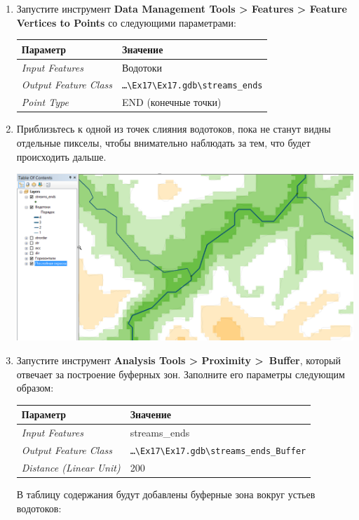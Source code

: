 \documentclass[]{book}
\theoremstyle{definition}
\theoremstyle{definition}
\theoremstyle{definition}
\theoremstyle{remark}
\begin{document}
\begin{enumerate}
\def\labelenumi{\arabic{enumi}.}
\item
  Запустите инструмент \textbf{Data Management Tools \textgreater{}
  Features \textgreater{} Feature Vertices to Points} со следующими
  параметрами:

  \begin{longtable}[]{@{}ll@{}}
  \toprule
  Параметр & Значение\tabularnewline
  \midrule
  \endhead
  \emph{Input Features} & Водотоки\tabularnewline
  \emph{Output Feature Class} &
  \texttt{\ldots{}\textbackslash{}Ex17\textbackslash{}Ex17.gdb\textbackslash{}streams\_ends}\tabularnewline
  \emph{Point Type} & END (конечные точки)\tabularnewline
  \bottomrule
  \end{longtable}
\item
  Приблизьтесь к одной из точек слияния водотоков, пока не станут видны
  отдельные пикселы, чтобы внимательно наблюдать за тем, что будет
  происходить дальше.

  \includegraphics{images/Ex17/image19.png}
\item
  Запустите инструмент \textbf{Analysis Tools \textgreater{} Proximity
  \textgreater{}~Buffer}, который отвечает за построение буферных зон.
  Заполните его параметры следующим образом:

  \begin{longtable}[]{@{}ll@{}}
  \toprule
  Параметр & Значение\tabularnewline
  \midrule
  \endhead
  \emph{Input Features} & streams\_ends\tabularnewline
  \emph{Output Feature Class} &
  \texttt{\ldots{}\textbackslash{}Ex17\textbackslash{}Ex17.gdb\textbackslash{}streams\_ends\_Buffer}\tabularnewline
  \emph{Distance (Linear Unit)} & 200\tabularnewline
  \bottomrule
  \end{longtable}

  В таблицу содержания будут добавлены буферные зона вокруг устьев
  водотоков:


\end{enumerate}
\end{document}
